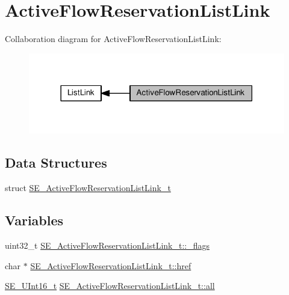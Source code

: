 \hypertarget{group__ActiveFlowReservationListLink}{}\section{Active\+Flow\+Reservation\+List\+Link}
\label{group__ActiveFlowReservationListLink}
Collaboration diagram for Active\+Flow\+Reservation\+List\+Link\+:\nopagebreak
\begin{figure}[H]
\begin{center}
\leavevmode
\includegraphics[width=318pt]{group__ActiveFlowReservationListLink}
\end{center}
\end{figure}
\subsection*{Data Structures}
\begin{DoxyCompactItemize}
\item 
struct \hyperlink{structSE__ActiveFlowReservationListLink__t}{S\+E\+\_\+\+Active\+Flow\+Reservation\+List\+Link\+\_\+t}
\end{DoxyCompactItemize}
\subsection*{Variables}
\begin{DoxyCompactItemize}
\item 
uint32\+\_\+t \hyperlink{group__ActiveFlowReservationListLink_gab04404a94a50dffbb0d4c65ca0b01082}{S\+E\+\_\+\+Active\+Flow\+Reservation\+List\+Link\+\_\+t\+::\+\_\+flags}
\item 
char $\ast$ \hyperlink{group__ActiveFlowReservationListLink_ga6b547f1f9bca676a3c9115adbaf2366f}{S\+E\+\_\+\+Active\+Flow\+Reservation\+List\+Link\+\_\+t\+::href}
\item 
\hyperlink{group__UInt16_gac68d541f189538bfd30cfaa712d20d29}{S\+E\+\_\+\+U\+Int16\+\_\+t} \hyperlink{group__ActiveFlowReservationListLink_gadf239f5f9855c67204029ef9589feced}{S\+E\+\_\+\+Active\+Flow\+Reservation\+List\+Link\+\_\+t\+::all}
\end{DoxyCompactItemize}


